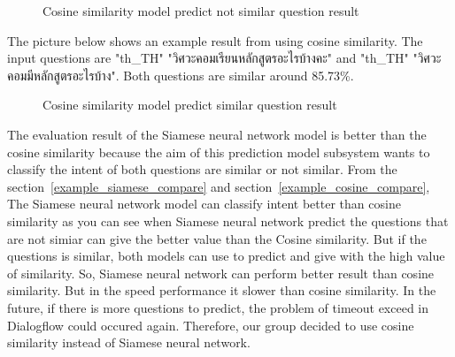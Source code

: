 \documentclass[12pt,oneside,openright,a4paper]{cpe-english-project}
\begin{document}
\begin{figure}[!h]\centering
{}
\caption{Cosine similarity model predict not similar question result}\label{fig:Cosine result by compare questions which not similar}
\end{figure}

The picture below shows an example result from using cosine similarity. The input questions are
{
\XeTeXlinebreaklocale "th_TH"	
\thaifont 
"วิศวะคอมเรียนหลักสูตรอะไรบ้างคะ"}
and
{
\XeTeXlinebreaklocale "th_TH"	
\thaifont 
"วิศวะคอมมีหลักสูตรอะไรบ้าง". 
}Both questions are similar around 85.73\%.
\begin{figure}[!h]\centering
{}
\caption{Cosine similarity model predict similar question result}\label{fig:Cosine result by compare questions which similar}
\end{figure}
\label{evaluation prediction}
The evaluation result of the Siamese neural network model is better than the cosine similarity because the aim of this prediction model subsystem wants to classify the intent of both questions are similar or not similar. 
From the section~\ref*{example_siamese_compare} and section~\ref*{example_cosine_compare},
The Siamese neural network model can classify intent better than cosine similarity as you can see when Siamese neural network predict the questions that are not simiar can give the better value than the Cosine similarity. But if the questions is similar, both models can use to predict and give with the high value of similarity.
So, Siamese neural network can perform better result than cosine similarity. But in the speed performance it slower than cosine similarity. In the future, if there is more questions to predict, the problem of timeout exceed in Dialogflow could occured again. Therefore, our group decided to use cosine similarity instead of Siamese neural network.
\end{document}
